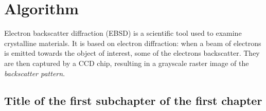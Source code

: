 \chapter{Algorithm}

Electron backscatter diffraction (EBSD) is a scientific tool used to examine crystalline materials. It is based on electron diffraction: when a beam of electrons is emitted towards the object of interest, some of the electrons backscatter.  They are then captured by a CCD chip, resulting in a grayscale raster image of the \emph{backscatter pattern}.

\section{Title of the first subchapter of the first chapter}

